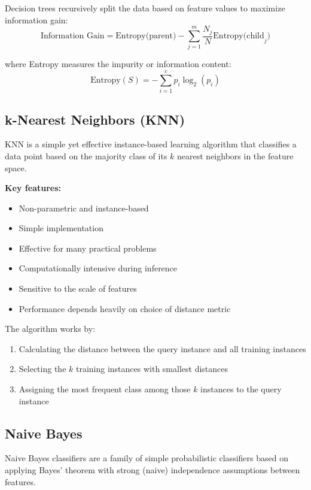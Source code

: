 \documentclass[11pt,a4paper]{report}
\begin{document}
Decision trees recursively split the data based on feature values to maximize information gain:
\begin{equation}
\text{Information Gain} = \text{Entropy(parent)} - \sum_{j=1}^{m} \frac{N_j}{N} \text{Entropy(child}_j)
\end{equation}

where Entropy measures the impurity or information content:
\begin{equation}
\text{Entropy}(S) = -\sum_{i=1}^{c} p_i \log_2(p_i)
\end{equation}

\subsection{k-Nearest Neighbors (KNN)}
KNN is a simple yet effective instance-based learning algorithm that classifies a data point based on the majority class of its $k$ nearest neighbors in the feature space.

\textbf{Key features:}
\begin{itemize}
    \item Non-parametric and instance-based
    \item Simple implementation
    \item Effective for many practical problems
    \item Computationally intensive during inference
    \item Sensitive to the scale of features
    \item Performance depends heavily on choice of distance metric
\end{itemize}

The algorithm works by:
\begin{enumerate}
    \item Calculating the distance between the query instance and all training instances
    \item Selecting the $k$ training instances with smallest distances
    \item Assigning the most frequent class among those $k$ instances to the query instance
\end{enumerate}

\subsection{Naive Bayes}
Naive Bayes classifiers are a family of simple probabilistic classifiers based on applying Bayes' theorem with strong (naive) independence assumptions between features.
\end{document}
